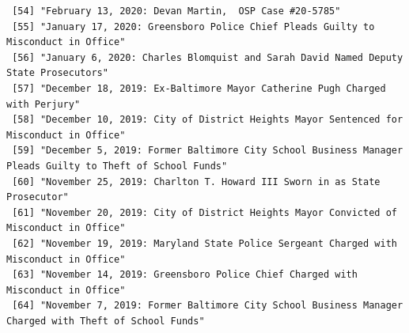 \documentclass[
  letterpaper,
  DIV=11,
  numbers=noendperiod]{scrreprt}
\begin{document}
\begin{verbatim}
 [54] "February 13, 2020: Devan Martin,  OSP Case #20-5785"                                                                                                                                                                                                 
 [55] "January 17, 2020: Greensboro Police Chief Pleads Guilty to Misconduct in Office"                                                                                                                                                                     
 [56] "January 6, 2020: Charles Blomquist and Sarah David Named Deputy State Prosecutors"                                                                                                                                                                   
 [57] "December 18, 2019: Ex-Baltimore Mayor Catherine Pugh Charged with Perjury"                                                                                                                                                                           
 [58] "December 10, 2019: City of District Heights Mayor Sentenced for Misconduct in Office"                                                                                                                                                                
 [59] "December 5, 2019: Former Baltimore City School Business Manager Pleads Guilty to Theft of School Funds"                                                                                                                                              
 [60] "November 25, 2019: Charlton T. Howard III Sworn in as State Prosecutor"                                                                                                                                                                              
 [61] "November 20, 2019: City of District Heights Mayor Convicted of Misconduct in Office"                                                                                                                                                                 
 [62] "November 19, 2019: Maryland State Police Sergeant Charged with Misconduct in Office"                                                                                                                                                                 
 [63] "November 14, 2019: Greensboro Police Chief Charged with Misconduct in Office"                                                                                                                                                                        
 [64] "November 7, 2019: Former Baltimore City School Business Manager Charged with Theft of School Funds"                                                                                                                                                  

\end{verbatim}
\end{document}

